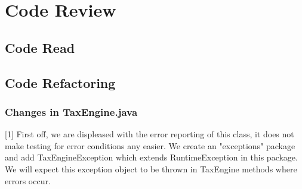 \documentclass[11pt]{article}
\begin{document}
%





\section{Code Review}

\subsection{Code Read}


\subsection{Code Refactoring}



\subsubsection{Changes in TaxEngine.java}

[1] First off, we are displeased with the error reporting of this class, it does not make testing for error conditions any easier. We create an "exceptions" package and add TaxEngineException which extends RuntimeException in this package. We will expect this exception object to be thrown in TaxEngine methods where errors occur. 
\end{document}
